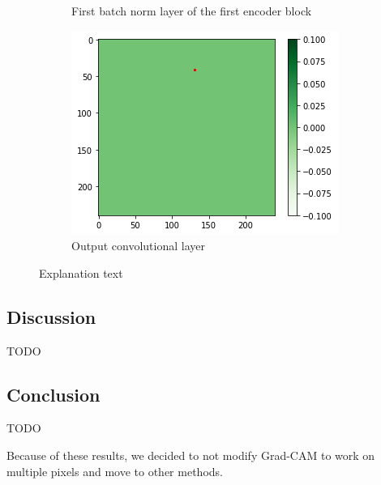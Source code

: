 \begin{figure}[H]
\begin{subfigure}{.33\textwidth}
        \caption{First batch norm layer of the first encoder block}
    \end{subfigure}%
        \begin{subfigure}{.33\textwidth}
        \centering
        \includegraphics[width=\linewidth]{chapters/04_segmentation/images/grad_cam_36.png}
        \caption{Output convolutional layer}
    \end{subfigure}
    \caption{Explanation text}
\end{figure}

\subsection{Discussion}
TODO

\subsection{Conclusion}
TODO

Because of these results, we decided to not modify Grad-CAM to work on multiple pixels and move to other methods.